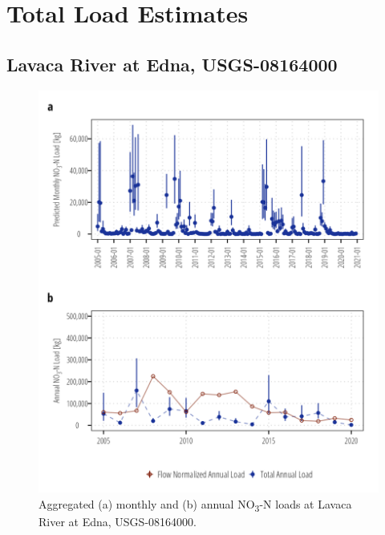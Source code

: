 \documentclass[
]{article}
\begin{document}
\hypertarget{total-load-estimates}{%
\section{Total Load Estimates}\label{total-load-estimates}}

\hypertarget{lavaca-river-at-edna-usgs-08164000}{%
\subsection{Lavaca River at Edna,
USGS-08164000}\label{lavaca-river-at-edna-usgs-08164000}}

\begin{figure}[h]

{\centering \includegraphics{load_estimates_files/figure-pdf/no3_aggregate-08164000-1.png}

}

\caption{Aggregated (a) monthly and (b) annual NO\textsubscript{3}-N
loads at Lavaca River at Edna, USGS-08164000.}

\end{figure}
\end{document}

